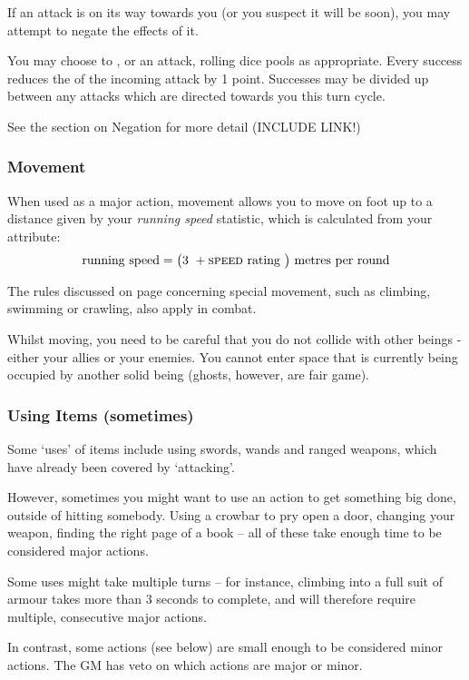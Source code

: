 	If an attack is on its way towards you (or you suspect it will be soon), you may attempt to negate the effects of it. 
	
	You may choose to ,  or  an attack, rolling dice pools as appropriate. Every success reduces the  of the incoming attack by 1 point. Successes may be divided up between any attacks which are directed towards you this turn cycle. 
	
	See the section on Negation for more detail (INCLUDE LINK!)
	
 \subsubsection{Movement}
 
 When used as a major action, movement allows you to move on foot up to a distance given by your {\it running speed} statistic, which is calculated from your  attribute:
\small
$$ \text{running speed} = \big(\text{3 } + \text{\textsc{speed} rating }\big) \text{ metres per round} $$  
\normalsize

The rules discussed on page \pageref{S:SpecialMovement} concerning special movement, such as climbing, swimming or crawling, also apply in combat. 

Whilst moving, you need to be careful that you do not collide with other beings - either your allies or your enemies. You cannot enter space that is currently being occupied by another solid being (ghosts, however, are fair game). 

 \subsubsection{Using Items (sometimes)}
 
Some `uses' of items include using swords, wands and ranged weapons, which have already been covered by `attacking'. 

However, sometimes you might want to use an action to get something big done, outside of hitting somebody. Using a crowbar to pry open a door, changing your weapon, finding the right page of a book -- all of these take enough time to be considered major actions. 

Some uses might take multiple turns -- for instance, climbing into a full suit of armour takes more than 3 seconds to complete, and will therefore require multiple, consecutive major actions. 

In contrast, some actions (see below) are small enough to be considered minor actions. The GM has veto on which actions are major or minor. 

